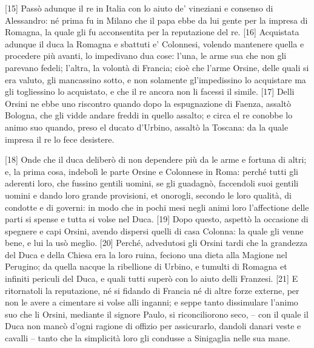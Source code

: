 {[}15{]} Passò adunque il re in Italia con lo aiuto de' vineziani e
consenso di Alessandro: né prima fu in Milano che il papa ebbe da lui
gente per la impresa di Romagna, la quale gli fu acconsentita per la
reputazione del re. {[}16{]} Acquistata adunque il duca la Romagna e
sbattuti e' Colonnesi, volendo mantenere quella e procedere più avanti,
lo impedivano dua cose: l'una, le arme sua che non gli parevano fedeli;
l'altra, la volontà di Francia; cioè che l'arme Orsine, delle quali si
era valuto, gli mancassino sotto, e non solamente gl'impedissino lo
acquistare ma gli togliessino lo acquistato, e che il re ancora non li
facessi il simile. {[}17{]} Delli Orsini ne ebbe uno riscontro quando
dopo la espugnazione di Faenza, assaltò Bologna, che gli vidde andare
freddi in quello assalto; e circa el re conobbe lo animo suo quando,
preso el ducato d'Urbino, assaltò la Toscana: da la quale impresa il re
lo fece desistere.

{[}18{]} Onde che il duca deliberò di non dependere più da le arme e
fortuna di altri; e, la prima cosa, indebolì le parte Orsine e Colonnese
in Roma: perché tutti gli aderenti loro, che fussino gentili uomini, se
gli guadagnò, faccendoli suoi gentili uomini e dando loro grande
provisioni, et onorogli, secondo le loro qualità, di condotte e di
governi: in modo che in pochi mesi negli animi loro l'affectione delle
parti si spense e tutta si volse nel Duca. {[}19{]} Dopo questo, aspettò
la occasione di spegnere e capi Orsini, avendo dispersi quelli di casa
Colonna: la quale gli venne bene, e lui la usò meglio. {[}20{]} Perché,
advedutosi gli Orsini tardi che la grandezza del Duca e della Chiesa era
la loro ruina, feciono una dieta alla Magione nel Perugino; da quella
nacque la ribellione di Urbino, e tumulti di Romagna et infiniti
periculi del Duca, e quali tutti superò con lo aiuto delli Franzesi.
{[}21{]} E ritornatoli la reputazione, né si fidando di Francia né di
altre forze externe, per non le avere a cimentare si volse alli inganni;
e seppe tanto dissimulare l'animo suo che li Orsini, mediante il signore
Paulo, si riconciliorono seco, -- con il quale il Duca non mancò d'ogni
ragione di offizio per assicurarlo, dandoli danari veste e cavalli --
tanto che la simplicità loro gli condusse a Sinigaglia nelle sua mane.

